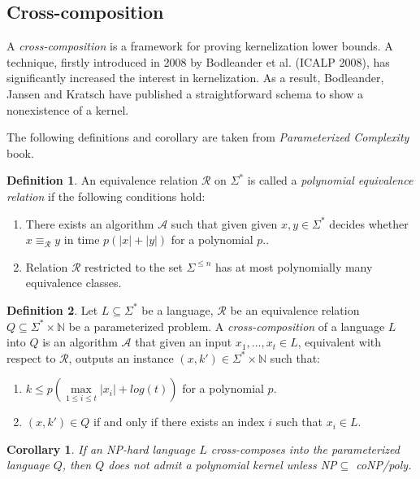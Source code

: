 \documentclass[en]{pracamgr}
\newtheorem{corollary}{Corollary}
\theoremstyle{definition}
\newtheorem{definition}{Definition}
\begin{document}
\subsection{Cross-composition}

A \emph{cross-composition} is a framework for proving kernelization lower bounds. A technique, firstly introduced in 2008 by Bodleander et al. (ICALP 2008), has significantly increased the interest in kernelization. As a result, Bodleander, Jansen and Kratsch have published a straightforward schema to show a nonexistence of a kernel.

The following definitions and corollary are taken from \textit{Parameterized Complexity} book. %

\begin{definition}\label{polynomial equivalence relation}
	An equivalence relation $\mathcal{R}$ on $\Sigma^*$ is called a \textit{polynomial equivalence relation} if the following conditions hold:
	\begin{enumerate}
		\item There exists an algorithm $\mathcal{A}$ such that given given $x,y \in \Sigma^*$ decides whether $x \equiv_{\mathcal{R}} y$ in time $p(|x|+|y|)$ for a polynomial $p$..
		\item Relation $\mathcal{R}$ restricted to the set $\Sigma^{\leq n}$ has at most polynomially many equivalence classes.
	\end{enumerate}
\end{definition}

\begin{definition}\label{cross-composition}
	Let $L \subseteq \Sigma^*$ be a language, $\mathcal{R}$ be an equivalence relation $Q \subseteq \Sigma^* \times \mathbb{N}$ be a parameterized problem. A \textit{cross-composition} of a language $L$ into $Q$ is an algorithm $\mathcal{A}$ that given an input $x_1,...,x_t \in L$, equivalent with respect to $\mathcal{R}$, outputs an instance $(x,k') \in \Sigma^* \times \mathbb{N}$ such that:
	\begin{enumerate}
		\item $k \leq p(\max\limits_{1 \leq i \leq t} |x_i| + log(t))$ for a polynomial $p$.
		\item $(x,k') \in Q$ if and only if there exists an index $i$ such that $x_i \in L$.
	\end{enumerate}
\end{definition}

\begin{corollary}\label{nokernel}
	If an NP-hard language $L$ cross-composes into the parameterized language $Q$, then $Q$ does not admit a polynomial kernel unless \textit{NP$\subseteq$ coNP/poly}.
\end{corollary}
\end{document}
